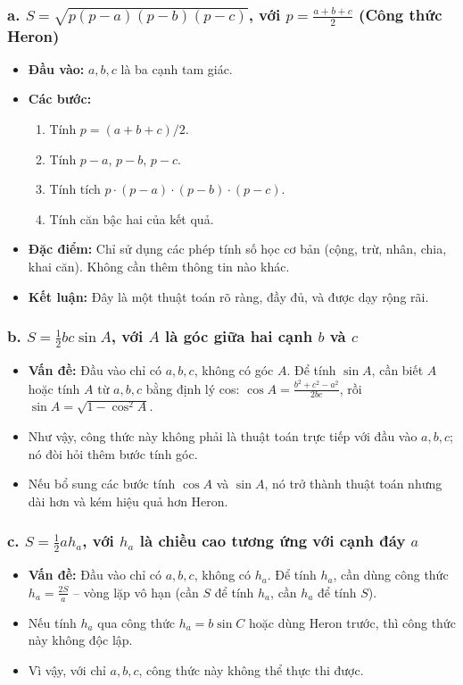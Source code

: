 \documentclass[12pt,a4paper]{article}
\begin{document}
\subsubsection*{a. $S = \sqrt{p(p-a)(p-b)(p-c)}$, với $p = \frac{a+b+c}{2}$ (Công thức Heron)}
\begin{itemize}
    \item \textbf{Đầu vào:} $a,b,c$ là ba cạnh tam giác.
    \item \textbf{Các bước:}
    \begin{enumerate}
        \item Tính $p = (a+b+c)/2$.
        \item Tính $p-a$, $p-b$, $p-c$.
        \item Tính tích $p \cdot (p-a) \cdot (p-b) \cdot (p-c)$.
        \item Tính căn bậc hai của kết quả.
    \end{enumerate}
    \item \textbf{Đặc điểm:} Chỉ sử dụng các phép tính số học cơ bản (cộng, trừ, nhân, chia, khai căn). Không cần thêm thông tin nào khác.
    \item \textbf{Kết luận:} Đây là một thuật toán rõ ràng, đầy đủ, và được dạy rộng rãi.
\end{itemize}

\subsubsection*{b. $S = \frac{1}{2}bc \sin A$, với $A$ là góc giữa hai cạnh $b$ và $c$}
\begin{itemize}
    \item \textbf{Vấn đề:} Đầu vào chỉ có $a,b,c$, không có góc $A$. Để tính $\sin A$, cần biết $A$ hoặc tính $A$ từ $a,b,c$ bằng định lý cos: $\cos A = \frac{b^2 + c^2 - a^2}{2bc}$, rồi $\sin A = \sqrt{1-\cos^2 A}$.
    \item Như vậy, công thức này không phải là thuật toán trực tiếp với đầu vào $a,b,c$; nó đòi hỏi thêm bước tính góc.
    \item Nếu bổ sung các bước tính $\cos A$ và $\sin A$, nó trở thành thuật toán nhưng dài hơn và kém hiệu quả hơn Heron.
\end{itemize}

\subsubsection*{c. $S = \frac{1}{2}ah_a$, với $h_a$ là chiều cao tương ứng với cạnh đáy $a$}
\begin{itemize}
    \item \textbf{Vấn đề:} Đầu vào chỉ có $a,b,c$, không có $h_a$. Để tính $h_a$, cần dùng công thức $h_a = \frac{2S}{a}$ – vòng lặp vô hạn (cần $S$ để tính $h_a$, cần $h_a$ để tính $S$).
    \item Nếu tính $h_a$ qua công thức $h_a = b\sin C$ hoặc dùng Heron trước, thì công thức này không độc lập.
    \item Vì vậy, với chỉ $a,b,c$, công thức này không thể thực thi được.
\end{itemize}
\end{document}
